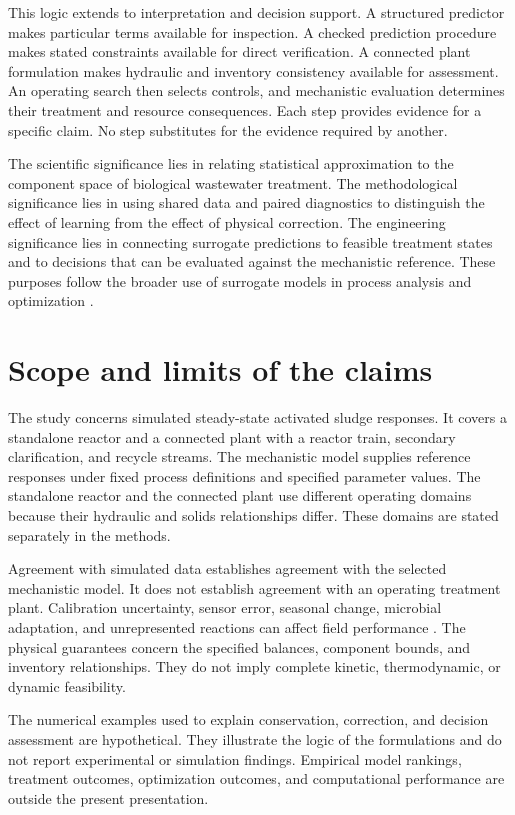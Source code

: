 This logic extends to interpretation and decision support. A structured predictor makes particular terms available for inspection. A checked prediction procedure makes stated constraints available for direct verification. A connected plant formulation makes hydraulic and inventory consistency available for assessment. An operating search then selects controls, and mechanistic evaluation determines their treatment and resource consequences. Each step provides evidence for a specific claim. No step substitutes for the evidence required by another.

The scientific significance lies in relating statistical approximation to the component space of biological wastewater treatment. The methodological significance lies in using shared data and paired diagnostics to distinguish the effect of learning from the effect of physical correction. The engineering significance lies in connecting surrogate predictions to feasible treatment states and to decisions that can be evaluated against the mechanistic reference. These purposes follow the broader use of surrogate models in process analysis and optimization \citep{McBride2019,BhosekarIerapetritou2018}.

\section{Scope and limits of the claims}

The study concerns simulated steady-state activated sludge responses. It covers a standalone reactor and a connected plant with a reactor train, secondary clarification, and recycle streams. The mechanistic model supplies reference responses under fixed process definitions and specified parameter values. The standalone reactor and the connected plant use different operating domains because their hydraulic and solids relationships differ. These domains are stated separately in the methods.

Agreement with simulated data establishes agreement with the selected mechanistic model. It does not establish agreement with an operating treatment plant. Calibration uncertainty, sensor error, seasonal change, microbial adaptation, and unrepresented reactions can affect field performance \citep{Machado2014,Newhart2019}. The physical guarantees concern the specified balances, component bounds, and inventory relationships. They do not imply complete kinetic, thermodynamic, or dynamic feasibility.

The numerical examples used to explain conservation, correction, and decision assessment are hypothetical. They illustrate the logic of the formulations and do not report experimental or simulation findings. Empirical model rankings, treatment outcomes, optimization outcomes, and computational performance are outside the present presentation.
